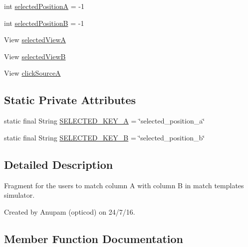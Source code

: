 \begin{DoxyCompactItemize}
\item 
int \hyperlink{classorg_1_1buildmlearn_1_1toolkit_1_1matchtemplate_1_1fragment_1_1MainFragment_a2611205368a8e9ad3b519acdf19ef32f}{selected\+PositionA} = -\/1
\item 
int \hyperlink{classorg_1_1buildmlearn_1_1toolkit_1_1matchtemplate_1_1fragment_1_1MainFragment_a551644e1a207590d8f911431584586c7}{selected\+PositionB} = -\/1
\item 
View \hyperlink{classorg_1_1buildmlearn_1_1toolkit_1_1matchtemplate_1_1fragment_1_1MainFragment_a3f22f954fc1bfa2c30f3440a9bbaad62}{selected\+ViewA}
\item 
View \hyperlink{classorg_1_1buildmlearn_1_1toolkit_1_1matchtemplate_1_1fragment_1_1MainFragment_aaa087f0b8191aecc84b89b60415743cc}{selected\+ViewB}
\item 
View \hyperlink{classorg_1_1buildmlearn_1_1toolkit_1_1matchtemplate_1_1fragment_1_1MainFragment_a92e9139e7b1ec0421995253c1d279748}{click\+SourceA}
\end{DoxyCompactItemize}
\subsection*{Static Private Attributes}
\begin{DoxyCompactItemize}
\item 
static final String \hyperlink{classorg_1_1buildmlearn_1_1toolkit_1_1matchtemplate_1_1fragment_1_1MainFragment_aaa308b6fd6a2d7225bba49e415881d22}{S\+E\+L\+E\+C\+T\+E\+D\+\_\+\+K\+E\+Y\+\_\+A} = \char`\"{}selected\+\_\+position\+\_\+a\char`\"{}
\item 
static final String \hyperlink{classorg_1_1buildmlearn_1_1toolkit_1_1matchtemplate_1_1fragment_1_1MainFragment_a88db5a44ba1cf59b52bfebd0a15efa11}{S\+E\+L\+E\+C\+T\+E\+D\+\_\+\+K\+E\+Y\+\_\+B} = \char`\"{}selected\+\_\+position\+\_\+b\char`\"{}
\end{DoxyCompactItemize}


\subsection{Detailed Description}
Fragment for the users to match column A with column B in match template\textquotesingle{}s simulator. 

Created by Anupam (opticod) on 24/7/16. 

\subsection{Member Function Documentation}
